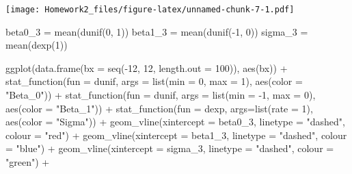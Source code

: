 \documentclass[
]{article}
\newenvironment{Shaded}{\begin{snugshade}}{\end{snugshade}}
\newcommand{\AttributeTok}[1]{\textcolor[rgb]{0.77,0.63,0.00}{#1}}
\newcommand{\DecValTok}[1]{\textcolor[rgb]{0.00,0.00,0.81}{#1}}
\newcommand{\FunctionTok}[1]{\textcolor[rgb]{0.00,0.00,0.00}{#1}}
\newcommand{\NormalTok}[1]{#1}
\newcommand{\OtherTok}[1]{\textcolor[rgb]{0.56,0.35,0.01}{#1}}
\newcommand{\SpecialCharTok}[1]{\textcolor[rgb]{0.00,0.00,0.00}{#1}}
\newcommand{\StringTok}[1]{\textcolor[rgb]{0.31,0.60,0.02}{#1}}
\begin{document}
\texttt{[image: Homework2\_files/figure-latex/unnamed-chunk-7-1.pdf]}

\begin{Shaded}
\begin{Highlighting}[]
\NormalTok{beta0\_3 }\OtherTok{=} \FunctionTok{mean}\NormalTok{(}\FunctionTok{dunif}\NormalTok{(}\DecValTok{0}\NormalTok{, }\DecValTok{1}\NormalTok{))}
\NormalTok{beta1\_3 }\OtherTok{=} \FunctionTok{mean}\NormalTok{(}\FunctionTok{dunif}\NormalTok{(}\SpecialCharTok{{-}}\DecValTok{1}\NormalTok{, }\DecValTok{0}\NormalTok{))}
\NormalTok{sigma\_3 }\OtherTok{=} \FunctionTok{mean}\NormalTok{(}\FunctionTok{dexp}\NormalTok{(}\DecValTok{1}\NormalTok{))}

\FunctionTok{ggplot}\NormalTok{(}\FunctionTok{data.frame}\NormalTok{(}\AttributeTok{bx =} \FunctionTok{seq}\NormalTok{(}\SpecialCharTok{{-}}\DecValTok{12}\NormalTok{, }\DecValTok{12}\NormalTok{, }\AttributeTok{length.out =} \DecValTok{100}\NormalTok{)), }\FunctionTok{aes}\NormalTok{(bx)) }\SpecialCharTok{+}
  \FunctionTok{stat\_function}\NormalTok{(}\AttributeTok{fun =}\NormalTok{ dunif, }\AttributeTok{args =} \FunctionTok{list}\NormalTok{(}\AttributeTok{min =} \DecValTok{0}\NormalTok{, }\AttributeTok{max =} \DecValTok{1}\NormalTok{), }\FunctionTok{aes}\NormalTok{(}\AttributeTok{color =} \StringTok{"Beta\_0"}\NormalTok{)) }\SpecialCharTok{+} 
  \FunctionTok{stat\_function}\NormalTok{(}\AttributeTok{fun =}\NormalTok{ dunif, }\AttributeTok{args =} \FunctionTok{list}\NormalTok{(}\AttributeTok{min =} \SpecialCharTok{{-}}\DecValTok{1}\NormalTok{, }\AttributeTok{max =} \DecValTok{0}\NormalTok{), }\FunctionTok{aes}\NormalTok{(}\AttributeTok{color =} \StringTok{"Beta\_1"}\NormalTok{)) }\SpecialCharTok{+} 
  \FunctionTok{stat\_function}\NormalTok{(}\AttributeTok{fun =}\NormalTok{ dexp, }\AttributeTok{args=}\FunctionTok{list}\NormalTok{(}\AttributeTok{rate =} \DecValTok{1}\NormalTok{), }\FunctionTok{aes}\NormalTok{(}\AttributeTok{color =} \StringTok{"Sigma"}\NormalTok{)) }\SpecialCharTok{+}
  \FunctionTok{geom\_vline}\NormalTok{(}\AttributeTok{xintercept =}\NormalTok{ beta0\_3, }\AttributeTok{linetype =} \StringTok{"dashed"}\NormalTok{, }\AttributeTok{colour =} \StringTok{"red"}\NormalTok{) }\SpecialCharTok{+}
  \FunctionTok{geom\_vline}\NormalTok{(}\AttributeTok{xintercept =}\NormalTok{ beta1\_3, }\AttributeTok{linetype =} \StringTok{"dashed"}\NormalTok{, }\AttributeTok{colour =} \StringTok{"blue"}\NormalTok{) }\SpecialCharTok{+}
  \FunctionTok{geom\_vline}\NormalTok{(}\AttributeTok{xintercept =}\NormalTok{ sigma\_3, }\AttributeTok{linetype =} \StringTok{"dashed"}\NormalTok{, }\AttributeTok{colour =} \StringTok{"green"}\NormalTok{) }\SpecialCharTok{+}

\end{Highlighting}
\end{Shaded}
\end{document}
